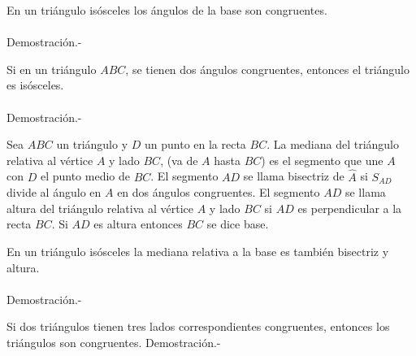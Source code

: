     \begin{proposicion}
	En un triángulo isósceles los ángulos de la base son congruentes.\\\\
	    Demostración.-\;
    \end{proposicion}

    \begin{proposicion}
	Si en un triángulo $ABC$, se tienen dos ángulos congruentes, entonces el triángulo es isósceles.\\\\
	    Demostración.-\;
    \end{proposicion}

\begin{tcolorbox}[colframe=white]
    \begin{def.}
	Sea $ABC$ un triángulo y $D$ un punto en la recta $BC$. La mediana del triángulo relativa al vértice  $A$ y lado $BC$, (va de $A$ hasta $BC$) es el segmento que une $A$ con $D$ el punto medio de $BC$. El segmento $AD$ se llama bisectriz de $\widehat{A}$ si $S_{AD}$ divide al ángulo en $A$ en dos ángulos congruentes. El segmento $AD$ se llama altura del triángulo relativa al vértice $A$ y lado $BC$ si $AD$ es perpendicular a la recta $BC$. Si $AD$ es altura entonces $BC$ se dice base.
    \end{def.}
\end{tcolorbox}

    \begin{proposicion}
	En un triángulo isósceles la mediana relativa a la base es también bisectriz y altura.\\\\
	    Demostración.-\;
    \end{proposicion}

    \begin{teo} Si dos triángulos tienen tres lados correspondientes congruentes, entonces los triángulos son congruentes.
	Demostración.-\;
    \end{teo}

